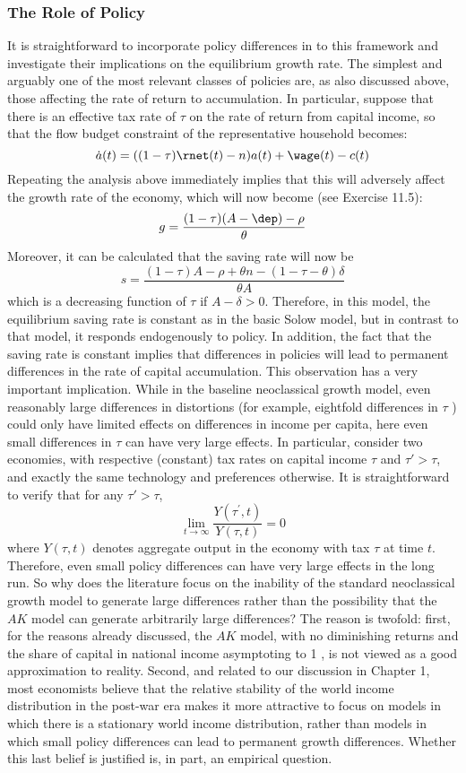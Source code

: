 \documentclass[\topdir/lecture\_notes.tex]{subfiles}
\begin{document}
\subsubsection{The Role of Policy}
It is straightforward to incorporate policy differences in to this framework and investigate their implications on the equilibrium growth rate. The simplest and arguably one of the most relevant classes of policies are, as also discussed above, those affecting the rate of return to accumulation. In particular, suppose that there is an effective tax rate of $\tau$ on the rate of return from capital income, so that the flow budget constraint of the representative household becomes:
\[
\dot{a}(t)=((1-\tau) \rnet(t)-n) a(t)+\wage(t)-c(t)
\]
Repeating the analysis above immediately implies that this will adversely affect the growth rate of the economy, which will now become (see Exercise 11.5):
\[
g=\frac{(1-\tau)(A-\dep)-\rho}{\theta}
\]
Moreover, it can be calculated that the saving rate will now be
\[
s=\frac{(1-\tau) A-\rho+\theta n-(1-\tau-\theta) \delta}{\theta A}
\]
which is a decreasing function of $\tau$ if $A-\delta>0$. Therefore, in this model, the equilibrium saving rate is constant as in the basic Solow model, but in contrast to that model, it responds endogenously to policy. In addition, the fact that the saving rate is constant implies that differences in policies will lead to permanent differences in the rate of capital accumulation. This observation has a very important implication. While in the baseline neoclassical growth model, even reasonably large differences in distortions (for example, eightfold differences in $\tau$ ) could only have limited effects on differences in income per capita, here even small differences in $\tau$ can have very large effects. In particular, consider two economies, with respective (constant) tax rates on capital income $\tau$ and $\tau'>\tau$, and exactly the same technology and preferences otherwise. It is straightforward to verify that for any $\tau'>\tau$,
\[
\lim _{t \rightarrow \infty} \frac{Y\left(\tau^{\prime}, t\right)}{Y(\tau, t)}=0
\] where $Y(\tau, t)$ denotes aggregate output in the economy with tax $\tau$ at time $t$. Therefore, even small policy differences can have very large effects in the long run. So why does the literature focus on the inability of the standard neoclassical growth model to generate large differences rather than the possibility that the $AK$ model can generate arbitrarily large differences? The reason is twofold: first, for the reasons already discussed, the $AK$ model, with no diminishing returns and the share of capital in national income asymptoting to 1 , is not viewed as a good approximation to reality. Second, and related to our discussion in Chapter 1, most economists believe that the relative stability of the world income distribution in the post-war era makes it more attractive to focus on models in which there is a stationary world income distribution, rather than models in which small policy differences can lead to permanent growth differences. Whether this last belief is justified is, in part, an empirical question.
\end{document}
